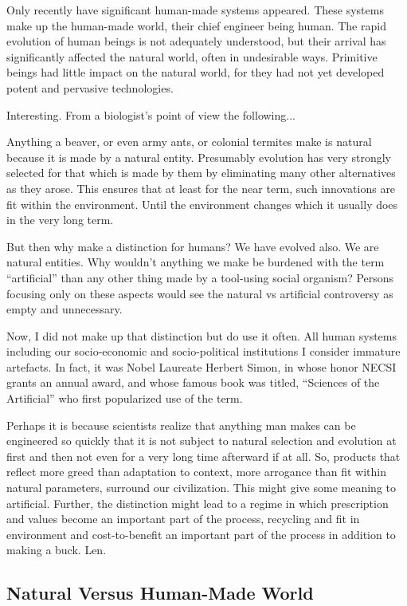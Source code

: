 Only recently have significant human-made systems appeared. These systems make up the human-made world, their chief engineer being human. The rapid evolution of human beings is not adequately understood, but their arrival has significantly affected the natural world, often in undesirable ways. Primitive beings had little impact on the natural world, for they had not yet developed potent and pervasive technologies.

	Interesting. From a biologist’s point of view the following...
    
Anything a beaver, or even army ants, or colonial termites make is natural because it is made by a natural entity. Presumably evolution has very strongly selected for that which is made by them by eliminating many other alternatives as they arose. This ensures that at least for the near term, such innovations are fit within the environment. Until the environment changes which it usually does in the very long term.

But then why make a distinction for humans?  We have evolved also. We are natural entities. Why wouldn’t anything we make be burdened with the term “artificial” than any other thing made by a tool-using social organism?  Persons focusing only on these aspects would see the natural vs artificial controversy as empty and unnecessary.

Now, I did not make up that distinction but do use it often. All human systems including our socio-economic and socio-political institutions I consider immature artefacts. In fact, it was Nobel Laureate Herbert Simon, in whose honor NECSI grants an annual award, and whose famous book was titled, “Sciences of the Artificial” who first popularized use of the term.

Perhaps it is because scientists realize that anything man makes can be engineered so quickly that it is not subject to natural selection and evolution at first and then not even for a very long time afterward if at all. So, products that reflect more greed than adaptation to context, more arrogance than fit within natural parameters, surround our civilization. This might give some meaning to artificial. Further, the distinction might lead to a regime in which prescription and values become an important part of the process, recycling and fit in environment and cost-to-benefit an important part of the process in addition to making a buck. Len.

\subsection{Natural Versus Human-Made World}\label{subsec:naturalVsHumanWorld}

